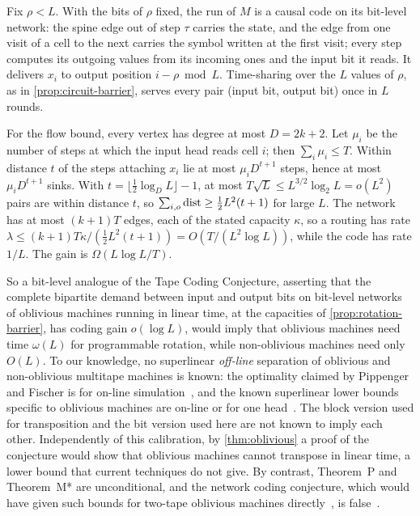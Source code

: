 \begin{informalproof}
Fix $\rho<L$. With the bits of $\rho$ fixed, the run of $M$ is a causal code on its bit-level network: the spine
edge out of step $\tau$ carries the state, and the edge from one visit of a cell to the next carries the
symbol written at the first visit; every step computes its outgoing values from its incoming ones and the
input bit it reads. It delivers $x_i$ to output position $i-\rho\bmod L$. Time-sharing over the $L$ values of $\rho$, as in
\cref{prop:circuit-barrier}, serves every pair (input bit, output bit) once in $L$ rounds.

For the flow bound, every vertex has degree at most $D=2k+2$. Let $\mu_i$ be the number of steps at which
the input head reads cell $i$; then $\sum_i\mu_i\le T$. Within distance $t$ of the steps attaching $x_i$
lie at most $\mu_iD^{t+1}$ steps, hence at most $\mu_iD^{t+1}$ sinks. With
$t=\lfloor\tfrac12\log_DL\rfloor-1$, at most $T\sqrt L\le L^{3/2}\log_2L=o(L^2)$ pairs are within distance
$t$, so $\sum_{i,o}\operatorname{dist}\ge\tfrac12L^2(t+1)$ for large $L$. The network has at most $(k+1)T$ edges, each of
the stated capacity $\kappa$, so a routing has rate $\lambda\le(k+1)T\kappa/(\tfrac12L^2(t+1))=O(T/(L^2\log L))$,
while the code has rate $1/L$. The gain is $\Omega(L\log L/T)$.
\end{informalproof}

So a bit-level analogue of the Tape Coding Conjecture, asserting that the complete bipartite demand between
input and output bits on bit-level networks of oblivious machines running in linear time, at the capacities of
\cref{prop:rotation-barrier}, has coding gain $o(\log L)$, would imply that oblivious machines need time
$\omega(L)$ for programmable rotation, while non-oblivious machines need only $O(L)$. To our knowledge, no superlinear \emph{off-line} separation of oblivious and non-oblivious multitape machines is known: the optimality
claimed by Pippenger and Fischer is for on-line simulation~\cite{PippengerFischer1979}, and the known
superlinear lower bounds specific to oblivious machines are on-line or for one head~\cite{Vitanyi1984}. The block
version used for transposition and the bit version used here are not known to imply each other.
Independently of this calibration, by \cref{thm:oblivious} a proof of the conjecture would show that oblivious
machines cannot transpose in linear time, a lower bound that current techniques do not give. By contrast, Theorem~P and Theorem~M* are unconditional, and
the network coding conjecture, which would have given such bounds for two-tape oblivious machines directly~\cite{AHJKL2006}, is
false~\cite{BravermanHe2026,ZhangLiLi2026}.
